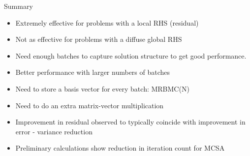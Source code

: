 \documentclass{beamer}
\begin{document}
\begin{frame}{Summary}

  \begin{itemize}
  \item Extremely effective for problems with a local RHS (residual)
  \item Not as effective for problems with a diffuse global RHS
  \item Need enough batches to capture solution structure to get good
    performance.
  \item Better performance with larger numbers of batches
  \item Need to store a basis vector for every batch: MRBMC(N)
  \item Need to do an extra matrix-vector multiplication
  \item Improvement in residual observed to typically coincide with
    improvement in error - variance reduction
  \item Preliminary calculations show reduction in iteration count for
    MCSA
  \end{itemize}

\end{frame}

\end{document}

